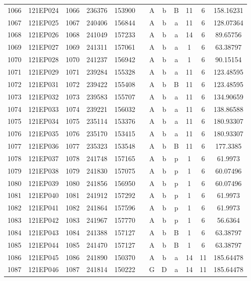 \begin{tabular}{|*{12}{c|}}
1066 & 121EP024 & 1066 & 236376 & 153900 &  & A & b & B & 11 & 6 & 158.16231 \\ 
1067 & 121EP025 & 1067 & 240406 & 156844 &  & A & b & a & 11 & 6 & 128.07364 \\ 
1068 & 121EP026 & 1068 & 241049 & 157233 &  & A & b & a & 14 & 6 & 89.65756 \\ 
1069 & 121EP027 & 1069 & 241311 & 157061 &  & A & b & a & 1 & 6 & 63.38797 \\ 
1070 & 121EP028 & 1070 & 241237 & 156942 &  & A & b & a & 1 & 6 & 90.15154 \\ 
1071 & 121EP029 & 1071 & 239284 & 155328 &  & A & b & a & 11 & 6 & 123.48595 \\ 
1072 & 121EP031 & 1072 & 239422 & 155408 &  & A & b & B & 11 & 6 & 123.48595 \\ 
1073 & 121EP032 & 1073 & 239583 & 155707 &  & A & b & a & 11 & 6 & 134.90659 \\ 
1074 & 121EP033 & 1074 & 239221 & 156032 &  & A & b & a & 11 & 6 & 138.86588 \\ 
1075 & 121EP034 & 1075 & 235114 & 153376 &  & A & b & a & 11 & 6 & 180.93307 \\ 
1076 & 121EP035 & 1076 & 235170 & 153415 &  & A & b & a & 11 & 6 & 180.93307 \\ 
1077 & 121EP036 & 1077 & 235323 & 153548 &  & A & b & B & 11 & 6 & 177.3385 \\ 
1078 & 121EP037 & 1078 & 241748 & 157165 &  & A & b & p & 1 & 6 & 61.9973 \\ 
1079 & 121EP038 & 1079 & 241830 & 157075 &  & A & b & p & 1 & 6 & 60.07496 \\ 
1080 & 121EP039 & 1080 & 241856 & 156950 &  & A & b & p & 1 & 6 & 60.07496 \\ 
1081 & 121EP040 & 1081 & 241912 & 157292 &  & A & b & p & 1 & 6 & 61.9973 \\ 
1082 & 121EP041 & 1082 & 241864 & 157596 &  & A & b & p & 1 & 6 & 61.9973 \\ 
1083 & 121EP042 & 1083 & 241967 & 157770 &  & A & b & p & 1 & 6 & 56.6364 \\ 
1084 & 121EP043 & 1084 & 241388 & 157127 &  & A & b & B & 1 & 6 & 63.38797 \\ 
1085 & 121EP044 & 1085 & 241470 & 157127 &  & A & b & B & 1 & 6 & 63.38797 \\ 
1086 & 121EP045 & 1086 & 241890 & 150370 &  & A & b & a & 14 & 11 & 185.64478 \\ 
1087 & 121EP046 & 1087 & 241814 & 150222 &  & G & D & a & 14 & 11 & 185.64478 \\ 

\end{tabular}
